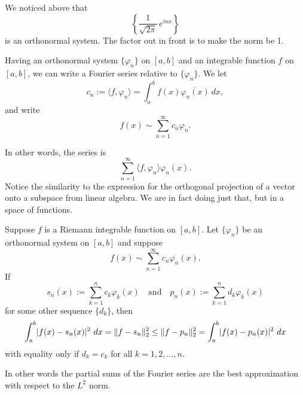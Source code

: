 We noticed above that
\begin{equation*}
\left\{ \frac{1}{\sqrt{2\pi}} \, e^{inx} \right\}
\end{equation*}
is an orthonormal system.  The factor out in front is to make the norm be 1.

Having an orthonormal system $\{ \varphi_n \}$ on $[a,b]$ and an integrable function $f$
on $[a,b]$, we can write
a Fourier series relative to $\{ \varphi_n \}$.  We let
\begin{equation*}
c_n :=
\langle f , \varphi_n \rangle
=
\int_a^b f(x) \overline{\varphi_n(x)} ~ dx ,
\end{equation*}
and write
\begin{equation*}
f(x) \sim \sum_{n=1}^\infty c_n \varphi_n .
\end{equation*}

In other words, the series is
\begin{equation*}
\sum_{n=1}^\infty \langle f , \varphi_n \rangle \varphi_n(x) .
\end{equation*}
Notice the similarity to the expression for the orthogonal
projection of a vector onto a subspace from linear algebra.  We are
in fact doing just that, but in a space of functions.

\begin{thm} \label{thm:l2bestapprox}
Suppose $f$ is a Riemann integrable function on $[a,b]$.
Let $\{ \varphi_n \}$ be an orthonormal system on $[a,b]$ and
suppose
\begin{equation*}
f(x) \sim \sum_{n=1}^\infty c_n \varphi_n(x) .
\end{equation*}
If
\begin{equation*}
s_n (x) := \sum_{k=1}^n c_k \varphi_k(x)
\quad\text{and}\quad
p_n (x) := \sum_{k=1}^n d_k \varphi_k(x)
\end{equation*}
for some other sequence $\{ d_k \}$, then
\begin{equation*}
\int_a^b \lvert {f(x)-s_n(x)} \rvert^2 ~ dx = \lVert {f-s_n} \rVert_2^2 \leq
\lVert {f-p_n} \rVert_2^2 = \int_a^b \lvert {f(x)-p_n(x)} \rvert^2 ~ dx
\end{equation*}
with equality only if $d_k = c_k$ for all $k=1,2,\ldots,n$.
\end{thm}

In other words the partial sums of the Fourier series are the best approximation with respect to the
$L^2$ norm.

